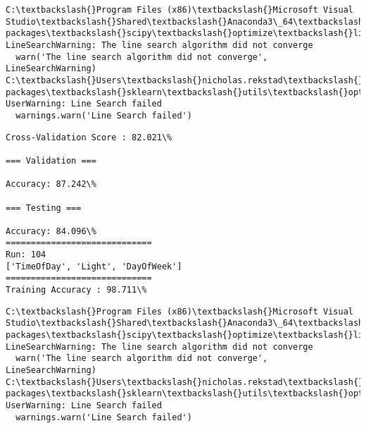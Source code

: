 \documentclass[11pt]{article}
\begin{document}
    \begin{Verbatim}[commandchars=\\\{\}]
C:\textbackslash{}Program Files (x86)\textbackslash{}Microsoft Visual Studio\textbackslash{}Shared\textbackslash{}Anaconda3\_64\textbackslash{}lib\textbackslash{}site-packages\textbackslash{}scipy\textbackslash{}optimize\textbackslash{}linesearch.py:313: LineSearchWarning: The line search algorithm did not converge
  warn('The line search algorithm did not converge', LineSearchWarning)
C:\textbackslash{}Users\textbackslash{}nicholas.rekstad\textbackslash{}AppData\textbackslash{}Roaming\textbackslash{}Python\textbackslash{}Python36\textbackslash{}site-packages\textbackslash{}sklearn\textbackslash{}utils\textbackslash{}optimize.py:195: UserWarning: Line Search failed
  warnings.warn('Line Search failed')

    \end{Verbatim}

    \begin{Verbatim}[commandchars=\\\{\}]
Cross-Validation Score : 82.021\%

=== Validation ===

Accuracy: 87.242\%

=== Testing ===

Accuracy: 84.096\%
=============================
Run: 104
['TimeOfDay', 'Light', 'DayOfWeek']
=============================
Training Accuracy : 98.711\%

    \end{Verbatim}

    \begin{Verbatim}[commandchars=\\\{\}]
C:\textbackslash{}Program Files (x86)\textbackslash{}Microsoft Visual Studio\textbackslash{}Shared\textbackslash{}Anaconda3\_64\textbackslash{}lib\textbackslash{}site-packages\textbackslash{}scipy\textbackslash{}optimize\textbackslash{}linesearch.py:313: LineSearchWarning: The line search algorithm did not converge
  warn('The line search algorithm did not converge', LineSearchWarning)
C:\textbackslash{}Users\textbackslash{}nicholas.rekstad\textbackslash{}AppData\textbackslash{}Roaming\textbackslash{}Python\textbackslash{}Python36\textbackslash{}site-packages\textbackslash{}sklearn\textbackslash{}utils\textbackslash{}optimize.py:195: UserWarning: Line Search failed
  warnings.warn('Line Search failed')

    \end{Verbatim}
\end{document}
